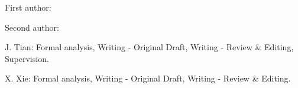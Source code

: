 \documentclass[lineno,pdflatex,sn-mathphys-num]{sn-jnl}%
\theoremstyle{thmstyleone}%
\theoremstyle{thmstyletwo}%
\theoremstyle{thmstylethree}%
\begin{document}
First author: 

Second author:

J. Tian: Formal analysis, Writing - Original Draft, Writing - Review \& Editing, Supervision.

X. Xie: Formal analysis, Writing - Original Draft, Writing - Review \& Editing.



\end{document}

